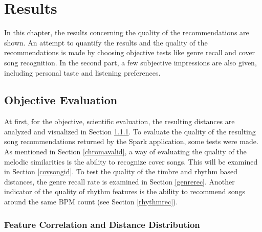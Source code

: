 
\chapter{Results}\label{bds2}

In this chapter, the results concerning the quality of the recommendations are shown. 
An attempt to quantify the results and the quality of the recommendations is made by choosing objective tests like genre recall and cover song recognition. In the second part, a few subjective impressions are also given, including personal taste and listening preferences. 

\section{Objective Evaluation}

At first, for the objective, scientific evaluation, the resulting distances are analyzed and visualized in Section \ref{featqual}.
To evaluate the quality of the resulting song recommendations returned by the Spark application, some tests were made. As mentioned in Section \ref{chromavalid}, a way of evaluating the quality of the melodic similarities is the ability to recognize cover songs. This will be examined in Section \ref{covsongid}. To test the quality of the timbre and rhythm based distances, the genre recall rate is examined in Section \ref{genrerec}. Another indicator of the quality of rhythm features is the ability to recommend songs around the same BPM count (see Section \ref{rhythmrec}). 
 

\subsection{Feature Correlation and Distance Distribution}\label{featqual}

